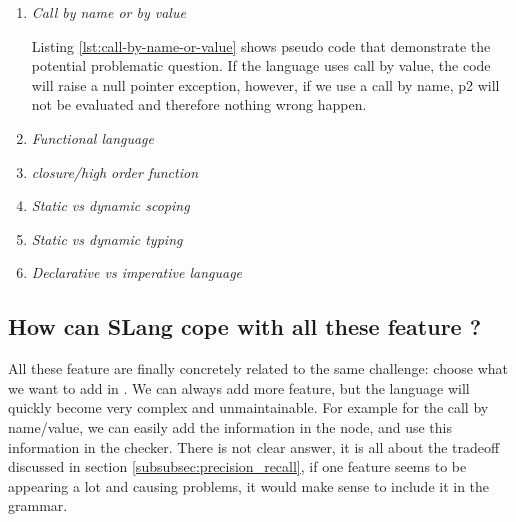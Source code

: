 \begin{enumerate}
	\item \textit{Call by name or by value} \newline
	
	
	Listing \ref{lst:call-by-name-or-value} shows pseudo code that demonstrate the potential problematic question. If the language uses call by value, the code will raise a null pointer exception, however, if we use a call by name, p2 will not be evaluated and therefore nothing wrong happen. \newline
	\item \textit{Functional language} \newline
	\item \textit{closure/high order function} \newline
	\item \textit{Static vs dynamic scoping} \newline
	\item \textit{Static vs dynamic typing} \newline
	\item \textit{Declarative vs imperative language} \newline
\end{enumerate}

\subsection{How can SLang cope with all these feature ?}
\label{subsec:how_can_slang_cope_with_features}

All these feature are finally concretely related to the same challenge: choose what we want to add in \slang. 
We can always add more feature, but the language will quickly become very complex and unmaintainable. For example for the call by name/value, we can easily add the information in the node, and use this information in the checker. 
There is not clear answer, it is all about the tradeoff discussed in section \ref{subsubsec:precision_recall}, if one feature seems to be appearing a lot and causing problems, it would make sense to include it in the grammar.
